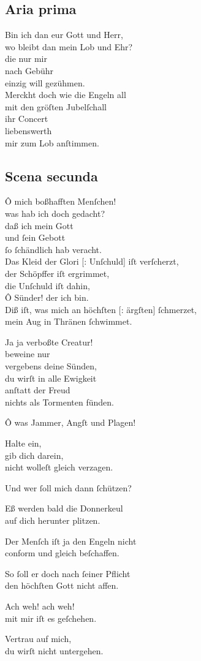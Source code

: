 \documentclass{ees}
\newenvironment{lyrics}[1]{%
  \subsection{#1}\nopagebreak%
  \begin{lyricslist}%
  \let\voice\item%
}{%
  \end{lyricslist}%
}
\begin{document}
\clearpage
\begin{lyrics}{Aria prima}
  \voice[Schöpffer]
  Bin ich dan eur Gott und Herr,\\
  wo bleibt dan mein Lob und Ehr?\\
  die nur mir\\
  nach Gebühr\\
  einzig will gezühmen.\\[1ex]
  Merckht doch wie die Engeln all\\
  mit den gröſten Jubelſchall\\
  ihr Concert\\
  liebenswerth\\
  mir zum Lob anſtimmen.
\end{lyrics}

\begin{lyrics}{Scena secunda}
  \voice[Adam]
  Ô mich boßhafften Menſchen!\\
  was hab ich doch gedacht?\\
  daß ich mein Gott\\
  und ſein Gebott\\
  ſo ſchändlich hab veracht.\\
  Das Kleid der Glori [: Unſchuld] iſt verſcherzt,\\
  der Schöpffer iſt ergrimmet,\\
  die Unſchuld iſt dahin,\\
  Ô Sünder! der ich bin.\\
  Diß iſt, was mich an höchſten [: ärgſten] ſchmerzet,\\
  mein Aug in Thränen ſchwimmet.

  \voice[Gerecht.]
  Ja ja verboßte Creatur!\\
  beweine nur\\
  vergebens deine Sünden,\\
  du wirſt in alle Ewigkeit\\
  anſtatt der Freud\\
  nichts als Tormenten fünden.

  \voice[Adam]
  Ô was Jammer, Angſt und Plagen!

  \voice[Barmh.]
  Halte ein,\\
  gib dich darein,\\
  nicht wolleſt gleich verzagen.

  \voice[Adam]
  Und wer ſoll mich dann ſchützen?

  \voice[Gerecht.]
  Eß werden bald die Donnerkeul\\
  auf dich herunter plitzen.

  \voice[Barmh.]
  Der Menſch iſt ja den Engeln nicht\\
  conform und gleich beſchaffen.
  \clearpage
  \voice[Gerecht.]
  So ſoll er doch nach ſeiner Pflicht\\
  den höchſten Gott nicht affen.

  \voice[Adam]
  Ach weh! ach weh!\\
  mit mir iſt es geſchehen.

  \voice[Barmh.]
  Vertrau auf mich,\\
  du wirſt nicht untergehen.
\end{lyrics}
\end{document}
